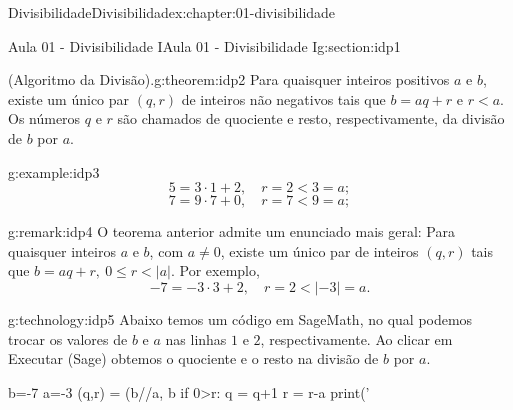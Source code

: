 \documentclass[oneside,10pt,]{book}
\numberwithin{equation}{section}
\newcommand{\lt}{<}
\begin{document}
\begin{chapterptx}{Divisibilidade}{}{Divisibilidade}{}{}{x:chapter:01-divisibilidade}
%
\begin{sectionptx}{Aula 01 - Divisibilidade I}{}{Aula 01 - Divisibilidade I}{}{}{g:section:idp1}
\begin{theorem}{(Algoritmo da Divisão).}{}{g:theorem:idp2}%
Para quaisquer inteiros positivos \(a\) e \(b\), existe um único par \((q, r)\) de inteiros não negativos tais que \(b = aq + r\) e \(r \lt a\). Os números \(q\) e \(r\) são chamados de quociente e resto, respectivamente, da divisão de \(b\) por \(a\).%
\end{theorem}
\begin{example}{}{g:example:idp3}%
%
\begin{equation*}
5 = 3\cdot 1 +2, \quad r=2\lt 3=a;
\end{equation*}
%
\begin{equation*}
7 = 9\cdot 7 +0, \quad r=7\lt 9=a;
\end{equation*}
%
\end{example}
\begin{remark}{}{g:remark:idp4}%
O teorema anterior admite um enunciado mais geral: Para quaisquer inteiros \(a\) e \(b\), com \(a\neq 0\), existe um único par de inteiros \((q, r)\) tais que \(b = aq + r, ~0 \leq r \lt |a|\). Por exemplo,%
\begin{equation*}
-7 = -3\cdot 3 + 2, \quad r=2\lt |-3| = a.
\end{equation*}
%
\end{remark}
\begin{technology}{}{g:technology:idp5}%
Abaixo temos um código em SageMath, no qual podemos trocar os valores de \(b\) e \(a\) nas linhas \(1\) e \(2\), respectivamente. Ao clicar em Executar (Sage) obtemos o quociente e o resto na divisão de \(b\) por \(a\).%
\begin{sageinput}
b=-7
a=-3
(q,r) = (b//a, b%
if 0>r:
    q = q+1
    r = r-a
print('%
\end{sageinput}
\begin{sageoutput}


\end{sageoutput}
\end{technology}
\end{sectionptx}
\end{chapterptx}
\end{document}
